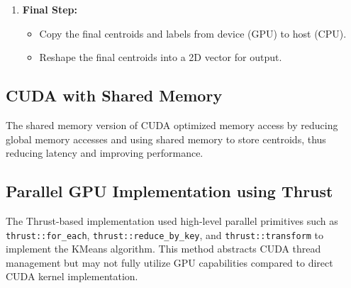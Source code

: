 \documentclass[letterpaper,12pt]{article}
\theoremstyle{remark}
\begin{document}
\begin{enumerate}
    \item \textbf{Final Step:}
    \begin{itemize}
        \item Copy the final centroids and labels from device (GPU) to host (CPU).
        \item Reshape the final centroids into a 2D vector for output.
    \end{itemize}
\end{enumerate}











\subsection{CUDA with Shared Memory}
The shared memory version of CUDA optimized memory access by reducing global memory accesses and using shared memory to store centroids, thus reducing latency and improving performance.










\subsection{Parallel GPU Implementation using Thrust}
The Thrust-based implementation used high-level parallel primitives such as \texttt{thrust::for\_each}, \texttt{thrust::reduce\_by\_key}, and \texttt{thrust::transform} to implement the KMeans algorithm. This method abstracts CUDA thread management but may not fully utilize GPU capabilities compared to direct CUDA kernel implementation.
\end{document}
